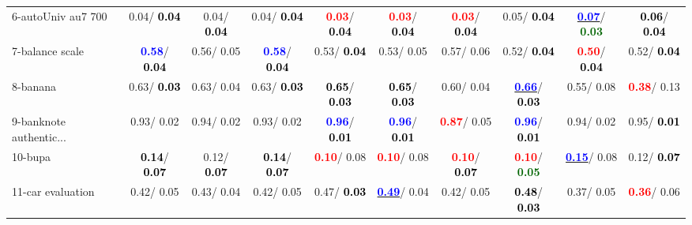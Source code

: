 \begin{table}[h]
\begin{center}
{\begin{tabular}{lc|c|c|c|c|c|c|c|c}
6-autoUniv au7 700 &   0.04/\textcolor{black}{\textbf{  0.04}} &   0.04/\textcolor{black}{\textbf{  0.04}} &   0.04/\textcolor{black}{\textbf{  0.04}} & \textcolor{red}{\textbf{  0.03}}/\textcolor{black}{\textbf{  0.04}} & \textcolor{red}{\textbf{  0.03}}/\textcolor{black}{\textbf{  0.04}} & \textcolor{red}{\textbf{  0.03}}/\textcolor{black}{\textbf{  0.04}} &   0.05/\textcolor{black}{\textbf{  0.04}} & \underline{\textcolor{blue}{\textbf{  0.07}}}/\textcolor{darkgreen}{\textbf{  0.03}} & \textcolor{black}{\textbf{  0.06}}/\textcolor{black}{\textbf{  0.04}} \\
7-balance scale & \textcolor{blue}{\textbf{  0.58}}/\textcolor{black}{\textbf{  0.04}} &   0.56/  0.05 & \textcolor{blue}{\textbf{  0.58}}/\textcolor{black}{\textbf{  0.04}} &   0.53/\textcolor{black}{\textbf{  0.04}} &   0.53/  0.05 &   0.57/  0.06 &   0.52/\textcolor{black}{\textbf{  0.04}} & \textcolor{red}{\textbf{  0.50}}/\textcolor{black}{\textbf{  0.04}} &   0.52/\textcolor{black}{\textbf{  0.04}} \\ \hline
8-banana &   0.63/\textcolor{black}{\textbf{  0.03}} &   0.63/  0.04 &   0.63/\textcolor{black}{\textbf{  0.03}} & \textcolor{black}{\textbf{  0.65}}/\textcolor{black}{\textbf{  0.03}} & \textcolor{black}{\textbf{  0.65}}/\textcolor{black}{\textbf{  0.03}} &   0.60/  0.04 & \underline{\textcolor{blue}{\textbf{  0.66}}}/\textcolor{black}{\textbf{  0.03}} &   0.55/  0.08 & \textcolor{red}{\textbf{  0.38}}/  0.13 \\
9-banknote authentic... &   0.93/  0.02 &   0.94/  0.02 &   0.93/  0.02 & \textcolor{blue}{\textbf{  0.96}}/\textcolor{black}{\textbf{  0.01}} & \textcolor{blue}{\textbf{  0.96}}/\textcolor{black}{\textbf{  0.01}} & \textcolor{red}{\textbf{  0.87}}/  0.05 & \textcolor{blue}{\textbf{  0.96}}/\textcolor{black}{\textbf{  0.01}} &   0.94/  0.02 &   0.95/\textcolor{black}{\textbf{  0.01}} \\
10-bupa & \textcolor{black}{\textbf{  0.14}}/\textcolor{black}{\textbf{  0.07}} &   0.12/\textcolor{black}{\textbf{  0.07}} & \textcolor{black}{\textbf{  0.14}}/\textcolor{black}{\textbf{  0.07}} & \textcolor{red}{\textbf{  0.10}}/  0.08 & \textcolor{red}{\textbf{  0.10}}/  0.08 & \textcolor{red}{\textbf{  0.10}}/\textcolor{black}{\textbf{  0.07}} & \textcolor{red}{\textbf{  0.10}}/\textcolor{darkgreen}{\textbf{  0.05}} & \underline{\textcolor{blue}{\textbf{  0.15}}}/  0.08 &   0.12/\textcolor{black}{\textbf{  0.07}} \\
11-car evaluation &   0.42/  0.05 &   0.43/  0.04 &   0.42/  0.05 &   0.47/\textcolor{black}{\textbf{  0.03}} & \underline{\textcolor{blue}{\textbf{  0.49}}}/  0.04 &   0.42/  0.05 & \textcolor{black}{\textbf{  0.48}}/\textcolor{black}{\textbf{  0.03}} &   0.37/  0.05 & \textcolor{red}{\textbf{  0.36}}/  0.06 \\

\end{tabular}}
\end{center}
\end{table}
